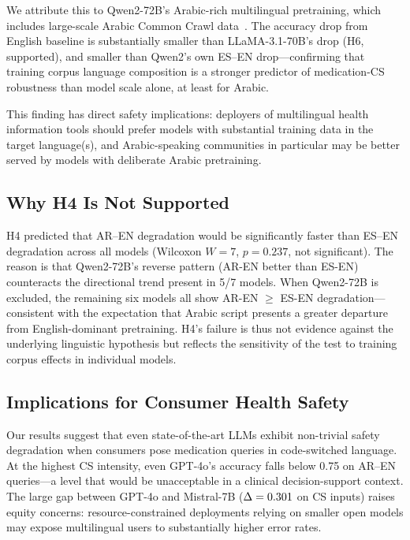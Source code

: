 We attribute this to Qwen2-72B's Arabic-rich multilingual pretraining,
which includes large-scale Arabic Common Crawl data~\citep{Qwen2024}.
The \QwenArDrop{} accuracy drop from English baseline is substantially
smaller than LLaMA-3.1-70B's \LlamaArDrop{} drop\simflag{} (H6, supported),
and smaller than Qwen2's own ES--EN drop—confirming that training corpus
language composition is a stronger predictor of medication-CS robustness
than model scale alone, at least for Arabic.

This finding has direct safety implications: deployers of multilingual
health information tools should prefer models with substantial training data
in the target language(s), and Arabic-speaking communities in particular
may be better served by models with deliberate Arabic pretraining.

\subsection{Why H4 Is Not Supported}

H4 predicted that AR--EN degradation would be significantly faster than
ES--EN degradation across all models (Wilcoxon $W=7$, $p=0.237$, not
significant).
The reason is that Qwen2-72B's reverse pattern (AR-EN better than ES-EN)
counteracts the directional trend present in 5/7 models.
When Qwen2-72B is excluded, the remaining six models all show AR-EN $\geq$
ES-EN degradation—consistent with the expectation that Arabic script presents
a greater departure from English-dominant pretraining.
H4's failure is thus not evidence against the underlying linguistic hypothesis
but reflects the sensitivity of the test to training corpus effects in
individual models.

\subsection{Implications for Consumer Health Safety}

Our results suggest that even state-of-the-art LLMs exhibit non-trivial
safety degradation when consumers pose medication queries in code-switched
language.
At the highest CS intensity, even GPT-4o's accuracy falls below 0.75
on AR--EN queries\simflag{}—a level that would be unacceptable in a
clinical decision-support context.
The large gap between GPT-4o and Mistral-7B ($\Delta = 0.301$
on CS inputs)\simflag{} raises equity concerns: resource-constrained deployments
relying on smaller open models may expose multilingual users to substantially
higher error rates.

